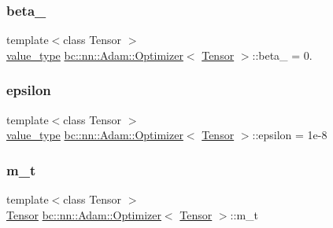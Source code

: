\mbox{\label{structbc_1_1nn_1_1Adam_1_1Optimizer_ace782b7ce94bce70e21bb0d0fa4f8dbd}} 
\subsubsection{\texorpdfstring{beta\+\_}{beta\_2}}
{\footnotesize\ttfamily template$<$class Tensor $>$ \\
\hyperlink{structbc_1_1nn_1_1Adam_1_1Optimizer_a6c0f45fad49cbec9368339576806cb75}{value\+\_\+type} \hyperlink{structbc_1_1nn_1_1Adam_1_1Optimizer}{bc\+::nn\+::\+Adam\+::\+Optimizer}$<$ \hyperlink{namespacebc_a659391e47ab612be3ba6c18cf9c89159}{Tensor} $>$\+::beta\+\_ = 0.}

\mbox{\label{structbc_1_1nn_1_1Adam_1_1Optimizer_a33306eaa695d49731f9065593b5aa7da}} 
\subsubsection{\texorpdfstring{epsilon}{epsilon}}
{\footnotesize\ttfamily template$<$class Tensor $>$ \\
\hyperlink{structbc_1_1nn_1_1Adam_1_1Optimizer_a6c0f45fad49cbec9368339576806cb75}{value\+\_\+type} \hyperlink{structbc_1_1nn_1_1Adam_1_1Optimizer}{bc\+::nn\+::\+Adam\+::\+Optimizer}$<$ \hyperlink{namespacebc_a659391e47ab612be3ba6c18cf9c89159}{Tensor} $>$\+::epsilon = 1e-\/8}

\mbox{\label{structbc_1_1nn_1_1Adam_1_1Optimizer_aa715d15f98e2b2828e74abab64f3e047}} 
\subsubsection{\texorpdfstring{m\+\_\+t}{m\_t}}
{\footnotesize\ttfamily template$<$class Tensor $>$ \\
\hyperlink{namespacebc_a659391e47ab612be3ba6c18cf9c89159}{Tensor} \hyperlink{structbc_1_1nn_1_1Adam_1_1Optimizer}{bc\+::nn\+::\+Adam\+::\+Optimizer}$<$ \hyperlink{namespacebc_a659391e47ab612be3ba6c18cf9c89159}{Tensor} $>$\+::m\+\_\+t}

